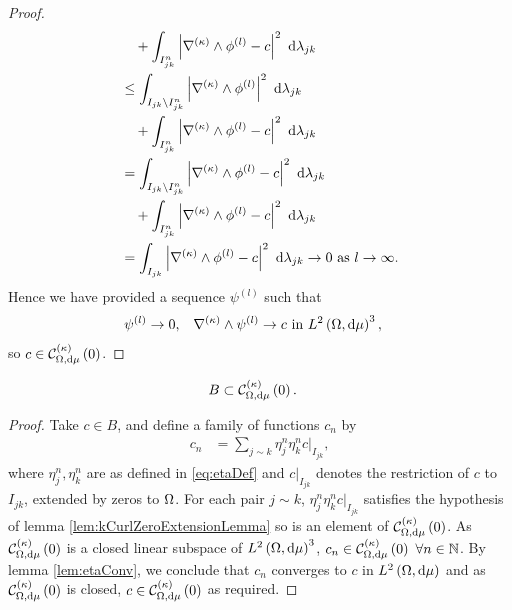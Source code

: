 \begin{proof}
\begin{align*}
		&\quad + \int_{I_{jk}^n}\left\lvert \nabla_{}^{(\kappa)}\wedge\phi^{(l)} - c \right\rvert^2 \ \mathrm{d}\lambda_{jk} \\
		&\leq \int_{I_{jk}\setminus I_{jk}^n}\left\lvert \nabla_{}^{(\kappa)}\wedge\phi^{(l)} \right\rvert^2 \ \mathrm{d}\lambda_{jk} \\
		&\quad + \int_{I_{jk}^n}\left\lvert \nabla_{}^{(\kappa)}\wedge\phi^{(l)} - c \right\rvert^2 \ \mathrm{d}\lambda_{jk} \\
		&= \int_{I_{jk}\setminus I_{jk}^n}\left\lvert \nabla_{}^{(\kappa)}\wedge\phi^{(l)} - c \right\rvert^2 \ \mathrm{d}\lambda_{jk} \\
		&\quad + \int_{I_{jk}^n}\left\lvert \nabla_{}^{(\kappa)}\wedge\phi^{(l)} - c \right\rvert^2 \ \mathrm{d}\lambda_{jk} \\
		&= \int_{I_{jk}}\left\lvert \nabla_{}^{(\kappa)}\wedge\phi^{(l)} - c \right\rvert^2 \ \mathrm{d}\lambda_{jk} \rightarrow 0 \ \text{as} \ l \rightarrow\infty.
	\end{align*}
	Hence we have provided a sequence $\psi^{(l)}$ such that
	\begin{align*}
		\psi^{(l)} \rightarrow 0, &\quad \nabla_{}^{(\kappa)}\wedge\psi^{(l)} \rightarrow c \text{ in } L^{2}\left( \Omega,\mathrm{d}\mu \right)^3,
	\end{align*}
	so $c\in\mathcal{C}_{ \Omega, \mathrm{d}\mu}^{(\kappa)}\left( 0 \right)$.
\end{proof}

\begin{lemma} \label{lem:BInkCurlZero}
	\begin{align*}
		B &\subset \mathcal{C}_{ \Omega, \mathrm{d}\mu}^{(\kappa)}\left( 0 \right).
	\end{align*}
\end{lemma}
\begin{proof}
	Take $c\in B$, and define a family of functions $c_n$ by 
	\begin{align*}
		c_n &= \sum_{j\sim k}\eta_j^n \eta_k^n c\vert_{I_{jk}},
	\end{align*}
	where $\eta_j^n, \eta_k^n$ are as defined in \eqref{eq:etaDef} and $c\vert_{I_{jk}}$ denotes the restriction of $c$ to $I_{jk}$, extended by zeros to $\Omega$.
	For each pair $j\sim k$, $\eta_j^n \eta_k^n c\vert_{I_{jk}}$ satisfies the hypothesis of lemma \ref{lem:kCurlZeroExtensionLemma} so is an element of $\mathcal{C}_{ \Omega, \mathrm{d}\mu}^{(\kappa)}\left( 0 \right)$.
	As $\mathcal{C}_{ \Omega, \mathrm{d}\mu}^{(\kappa)}\left( 0 \right)$ is a closed linear subspace of $L^{2}\left( \Omega,\mathrm{d}\mu \right)^3$, $c_n\in\mathcal{C}_{ \Omega, \mathrm{d}\mu}^{(\kappa)}\left( 0 \right) \ \forall n\in\mathbb{N}$.
	By lemma \ref{lem:etaConv}, we conclude that $c_n$ converges to $c$ in $L^{2}\left( \Omega,\mathrm{d}\mu \right)$ and as $\mathcal{C}_{ \Omega, \mathrm{d}\mu}^{(\kappa)}\left( 0 \right)$ is closed, $c\in\mathcal{C}_{ \Omega, \mathrm{d}\mu}^{(\kappa)}\left( 0 \right)$ as required.
\end{proof}

